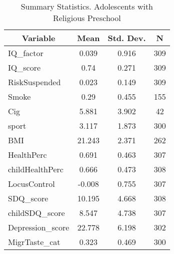 
\begin{table}[htbp]\centering \caption{Summary Statistics. Adolescents with Religious Preschool \label{schoolAdolmaternaReli}}
\begin{tabular}{l c c  c}\hline\hline
\multicolumn{1}{c}{\textbf{Variable}} & \textbf{Mean}
 & \textbf{Std. Dev.} & \textbf{N}\\ \hline
IQ\_factor & 0.039 & 0.916  & 309\\
IQ\_score & 0.74 & 0.271  & 309\\
RiskSuspended & 0.023 & 0.149  & 309\\
Smoke & 0.29 & 0.455  & 155\\
Cig & 5.881 & 3.902  & 42\\
sport & 3.117 & 1.873  & 300\\
BMI & 21.243 & 2.371  & 262\\
HealthPerc & 0.691 & 0.463  & 307\\
childHealthPerc & 0.666 & 0.473  & 308\\
LocusControl & -0.008 & 0.755  & 307\\
SDQ\_score & 10.195 & 4.668  & 308\\
childSDQ\_score & 8.547 & 4.738  & 307\\
Depression\_score & 22.778 & 6.198  & 302\\
MigrTaste\_cat & 0.323 & 0.469  & 300\\
\hline\end{tabular}
\end{table}
